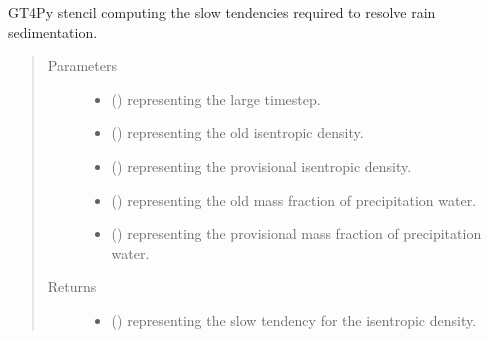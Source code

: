 \documentclass[letterpaper,10pt,english]{sphinxmanual}
\begin{document}
\begin{fulllineitems}
\begin{fulllineitems}
\end{fulllineitems}


\begin{fulllineitems}
\label{\detokenize{api:dycore.prognostic_isentropic_nonconservative_centered.PrognosticIsentropicNonconservativeCentered._stencil_computing_slow_tendencies_defs}}
GT4Py stencil computing the slow tendencies required to resolve rain sedimentation.
\begin{quote}\begin{description}
\item[{Parameters}] \leavevmode\begin{itemize}
\item {} 
 () \textendash{}  representing the large timestep.

\item {} 
 () \textendash{}  representing the old isentropic density.

\item {} 
 () \textendash{}  representing the provisional isentropic density.

\item {} 
 () \textendash{}  representing the old mass fraction of precipitation water.

\item {} 
 () \textendash{}  representing the provisional mass fraction of precipitation water.

\end{itemize}

\item[{Returns}] \leavevmode
\begin{itemize}
\item {} 
 () \textendash{}  representing the slow tendency for the isentropic density.


\end{itemize}
\end{description}
\end{quote}
\end{fulllineitems}
\end{fulllineitems}
\end{document}
